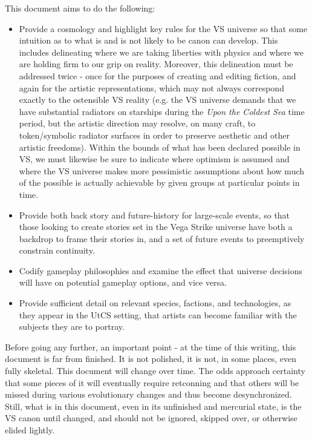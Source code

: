 This document aims to do the following:
\begin{itemize}
\item Provide a cosmology and highlight key rules for the VS universe
   so that some intuition as to what is and is not likely to be canon
   can develop. This includes delineating where we are taking
   liberties with physics and where we are holding firm to our grip on
   reality. Moreover, this delineation must be addressed twice - once
   for the purposes of creating and editing fiction, and again for the
   artistic representations, which may not always correspond exactly
   to the ostensible VS reality (e.g. the VS universe demands that we
   have substantial radiators on starships during the {\it Upon the
   Coldest Sea} time period, but the artistic direction may resolve,
   on many craft, to token/symbolic radiator surfaces in order to preserve
   aesthetic and other artistic freedoms). Within the bounds of what
   has been declared possible in VS, we must likewise be sure to
   indicate where optimism is assumed and where the VS universe makes
   more pessimistic assumptions about how much of the possible is
   actually achievable by given groups at particular points in time.
\item Provide both back story and future-history for large-scale
  events, so that those looking to create stories set in the Vega
  Strike universe have both a backdrop to frame their stories in, and
  a set of future events to preemptively constrain continuity.
\item Codify gameplay philosophies and examine the effect that universe decisions will have on potential gameplay options, and vice versa.
\item Provide sufficient detail on relevant species, factions, and
  technologies, as they appear in the UtCS setting, that artists can
  become familiar with the subjects they are to portray.
\end{itemize}

Before going any further, an important point - at the time of this
writing, this document is far from finished. It is not polished, it is
not, in some places, even fully skeletal. This document will change
over time. The odds approach certainty that some pieces of it will
eventually require retconning and that others will be missed during various
evolutionary changes and thus become
desynchronized. Still, what is in this document, even in its
unfinished and mercurial state, is the VS canon until changed, and
should not be ignored, skipped over, or otherwise elided lightly.

